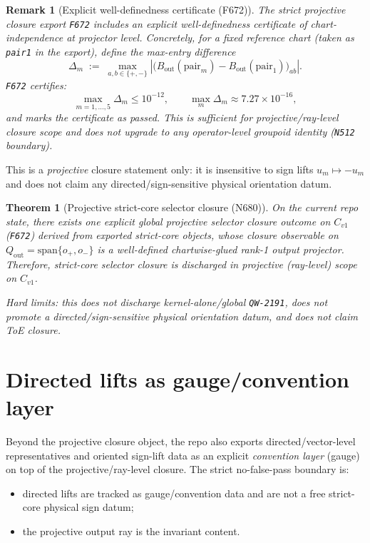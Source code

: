 \documentclass[11pt,a4paper]{article}
\newtheorem{theorem}{Theorem}[section]
\newtheorem{remark}{Remark}[section]
\begin{document}
\begin{remark}[Explicit well-definedness certificate (F672)]
The strict projective closure export \texttt{F672} includes an explicit \emph{well-definedness certificate} of chart-independence at projector level.
Concretely, for a fixed reference chart (taken as \texttt{pair1} in the export), define the max-entry difference
\[
\Delta_m
\;:=\;
\max_{a,b\in\{+,-\}}
\left|\bigl(B_{\mathrm{out}}(\mathrm{pair}_m)-B_{\mathrm{out}}(\mathrm{pair}_1)\bigr)_{ab}\right|.
\]
\texttt{F672} certifies:
\[
\max_{m=1,\dots,5}\Delta_m \le 10^{-12},
\qquad
\max_{m}\Delta_m \approx 7.27\times 10^{-16},
\]
and marks the certificate as passed. This is sufficient for \emph{projective/ray-level} closure scope and does not upgrade to any operator-level groupoid identity (\texttt{N512} boundary).
\end{remark}

This is a \emph{projective} closure statement only: it is insensitive to sign lifts $u_m\mapsto -u_m$ and does not claim any directed/sign-sensitive physical orientation datum.

\begin{theorem}[Projective strict-core selector closure (N680)]
On the current repo state, there exists one explicit global projective selector closure outcome on $C_{v1}$ (\texttt{F672}) derived from exported strict-core objects,
whose closure observable on $Q_{\mathrm{out}}=\mathrm{span}\{o_+,o_-\}$ is a well-defined chartwise-glued rank-1 output projector.
Therefore, strict-core selector closure is discharged in \emph{projective (ray-level) scope} on $C_{v1}$.

\emph{Hard limits:} this does not discharge kernel-alone/global \texttt{QW-2191}, does not promote a directed/sign-sensitive physical orientation datum, and does not claim ToE closure.
\end{theorem}
\section{Directed lifts as gauge/convention layer}

Beyond the projective closure object, the repo also exports directed/vector-level representatives and oriented sign-lift data as an explicit
\emph{convention layer} (gauge) on top of the projective/ray-level closure.
The strict no-false-pass boundary is:

\begin{itemize}
  \item directed lifts are tracked as gauge/convention data and are not a free strict-core physical sign datum;
  \item the projective output ray is the invariant content.
\end{itemize}
\end{document}
